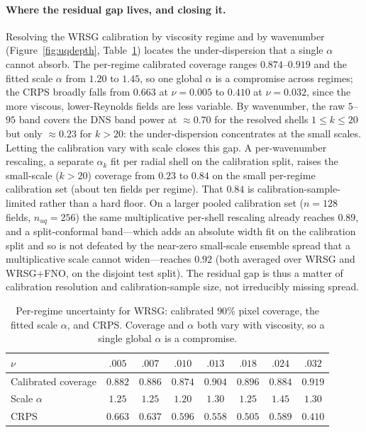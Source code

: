 \documentclass[10pt]{article} %
\begin{document}
\paragraph{Where the residual gap lives, and closing it.} Resolving the WRSG calibration by viscosity regime and by wavenumber (Figure~\ref{fig:uqdepth}, Table~\ref{tab:uqregime}) locates the under-dispersion that a single $\alpha$ cannot absorb. The per-regime calibrated coverage ranges $0.874$--$0.919$ and the fitted scale $\alpha$ from $1.20$ to $1.45$, so one global $\alpha$ is a compromise across regimes; the CRPS broadly falls from $0.663$ at $\nu=0.005$ to $0.410$ at $\nu=0.032$, since the more viscous, lower-Reynolds fields are less variable. By wavenumber, the raw $5$--$95$ band covers the DNS band power at $\approx 0.70$ for the resolved shells $1 \leq k \leq 20$ but only $\approx 0.23$ for $k > 20$: the under-dispersion concentrates at the small scales. Letting the calibration vary with scale closes this gap. A per-wavenumber rescaling, a separate $\alpha_k$ fit per radial shell on the calibration split, raises the small-scale ($k>20$) coverage from $0.23$ to $0.84$ on the small per-regime calibration set (about ten fields per regime). That $0.84$ is calibration-sample-limited rather than a hard floor. On a larger pooled calibration set ($n=128$ fields, $n_{uq}=256$) the same multiplicative per-shell rescaling already reaches $0.89$, and a split-conformal band---which adds an absolute width fit on the calibration split and so is not defeated by the near-zero small-scale ensemble spread that a multiplicative scale cannot widen---reaches $0.92$ (both averaged over WRSG and WRSG+FNO, on the disjoint test split). The residual gap is thus a matter of calibration resolution and calibration-sample size, not irreducibly missing spread.

\begin{table}[H]
\centering
\caption{Per-regime uncertainty for WRSG: calibrated $90\%$ pixel coverage, the fitted scale $\alpha$, and CRPS. Coverage and $\alpha$ both vary with viscosity, so a single global $\alpha$ is a compromise.}
\label{tab:uqregime}
\setlength{\tabcolsep}{4pt}
\begin{tabular}{lccccccc}
\toprule
$\nu$ & $.005$ & $.007$ & $.010$ & $.013$ & $.018$ & $.024$ & $.032$ \\
\midrule
Calibrated coverage & $0.882$ & $0.886$ & $0.874$ & $0.904$ & $0.896$ & $0.884$ & $0.919$ \\
Scale $\alpha$ & $1.25$ & $1.25$ & $1.20$ & $1.30$ & $1.25$ & $1.45$ & $1.30$ \\
CRPS & $0.663$ & $0.637$ & $0.596$ & $0.558$ & $0.505$ & $0.589$ & $0.410$ \\
\bottomrule
\end{tabular}
\end{table}
\end{document}
